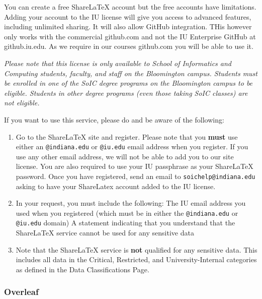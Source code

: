 You can create a free ShareLaTeX account but the free accounts have
limitations.  Adding your account to the IU license will give you access
to advanced features, including unlimited sharing.  
It will also allow GitHub integration. THis however only works with
the commercial github.com and not the IU Enterprise GitHub at
github.iu.edu. As we require in our courses github.com you will be
able to use it.

\textit{Please note that this license is only available to School of
Informatics and Computing students, faculty, and staff on the
Bloomington campus.  Students must be enrolled in one of the SoIC
degree programs on the Bloomington campus to be eligible.  Students in
other degree programs (even those taking SoIC classes) are not
eligible.}


If you want to use this service, please do and be aware of the following: 

\begin{enumerate}

\item Go to the ShareLaTeX site and register.  Please note that you
  {\bf must} use either an \verb|@indiana.edu| or \verb|@iu.edu| email
  address when you register. If you use any other email address, we
  will not be able to add you to our site license.  You are also
  required to use your IU passphrase as your ShareLaTeX password.
  Once you have registered, send an email to
  \verb|soichelp@indiana.edu| asking to have your ShareLatex account 
  added to the IU license.  

\item
  In your request, you must include the following: The IU email
  address you used when you registered (which must be in either the
  \verb|@indiana.edu| or \verb|@iu.edu| domain) A statement indicating
  that you understand that the ShareLaTeX service cannot be used for
  any sensitive data

\item Note that the ShareLaTeX service is {\bf not} qualified for any
  sensitive data. This includes all data in the Critical, Restricted,
  and University-Internal categories as defined in the Data
  Classifications Page.

\end{enumerate}


\subsubsection{Overleaf}\label{overleaf}

